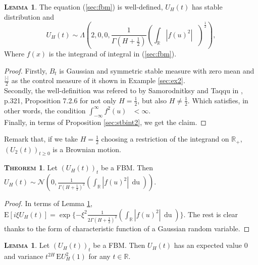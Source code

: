 \documentclass[a4paper, twoside, 11pt]{article}
\theoremstyle{definition}
\newtheorem{theorem}[definition]{\scshape Theorem}
\newtheorem{lemma}[definition]{\scshape Lemma}
\begin{document}
\begin{lemma}
  The equation (\ref{sec:fbm}) is well-defined, $U_H(t)$ has stable distribution and 
  \begin{equation*}
	U_H(t) \sim \Lambda(2, 0, 0, \frac{1}{\Gamma(H+\frac{1}{2})}(\int_{\mathbb{R}} |f(u)^2|\, \mathop{\frac{du}{2}})^\frac{1}{2}),
  \end{equation*}
  Where $f(x)$ is the integrand of integral in (\ref{sec:fbm}).
  \label{sec:l2}
\end{lemma}
\begin{proof}
  Firstly, $B_t$ is Gaussian and symmetric stable measure with zero mean and $\frac{|\cdot|}{2}$ as the control measure of it shown in Example \ref{sec:ex2}. \\
  Secondly, the well-definition was refered to by Samorodnitksy and Taqqu in \cite{samorodnitsky}, p.321, Proposition 7.2.6 for not only $H= \frac{1}{2}$, but also $H\neq \frac{1}{2}$. Which satisfies, in other words, the condition $\int_{-\infty}^{\infty}f^2(u)\,\mathop{\frac{du}{2}} < \infty$.\\
  Finally, in terms of Proposition \ref{sec:stbint2}, we get the claim.
\end{proof}
Remark that, if we take $H=\frac{1}{2}$ choosing a restriction of the integrand on $\mathbb{R}_+$, $(U_2(t))_{t\ge 0}$ is a Brownian motion. 	
\begin{theorem}
  Let $(U_H(t))_t$ be a FBM. Then $U_H(t) \sim \mathcal{N}(0, \frac{1}{\Gamma(H+\frac{1}{2})^2}(\int_{\mathbb{R}} |f(u)^2|\, \mathop{du}))$.
  \label{sec:the1}
\end{theorem}
\begin{proof}
  In terms of Lemma \ref{sec:l2}, $\mathrm{E}[i\xi U_H(t)] = \exp\{-\xi^2 \frac{1}{2\Gamma(H+\frac{1}{2})^2}(\int_{\mathbb{R}} |f(u)^2|\, \mathop{du})\}$. The rest is clear thanks to the form of characteristic function of a Gaussian random variable.
\end{proof}
\begin{lemma}
  Let $(U_H(t))_t$ be a FBM. Then $U_H(t)$ has an expected value $0$ and variance $t^{2H}\, \mathrm{E} U^2_H(1)$ for any $t \in \mathbb{R}$.
  \label{sec:fbmp1}
\end{lemma}
\end{document}
